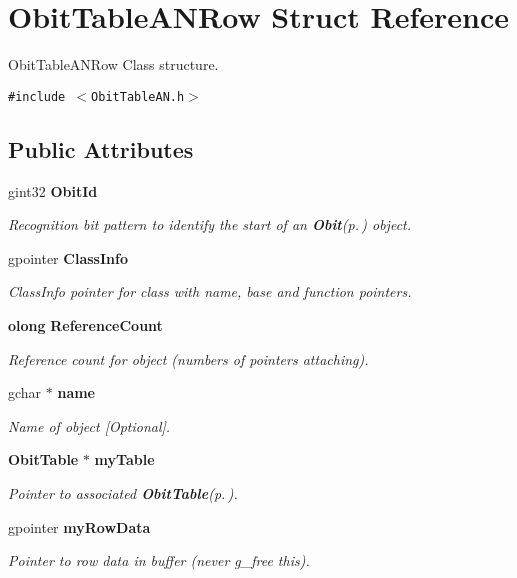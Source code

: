 \section{Obit\-Table\-ANRow Struct Reference}
\label{structObitTableANRow}
Obit\-Table\-ANRow Class structure.  


{\tt \#include $<$Obit\-Table\-AN.h$>$}

\subsection*{Public Attributes}
\begin{CompactItemize}
\item 
gint32 {\bf Obit\-Id}
\begin{CompactList}\small\item\em Recognition bit pattern to identify the start of an {\bf Obit}{\rm (p.\,\pageref{structObit})} object. \item\end{CompactList}\item 
gpointer {\bf Class\-Info}
\begin{CompactList}\small\item\em Class\-Info pointer for class with name, base and function pointers. \item\end{CompactList}\item 
{\bf olong} {\bf Reference\-Count}
\begin{CompactList}\small\item\em Reference count for object (numbers of pointers attaching). \item\end{CompactList}\item 
gchar $\ast$ {\bf name}
\begin{CompactList}\small\item\em Name of object [Optional]. \item\end{CompactList}\item 
{\bf Obit\-Table} $\ast$ {\bf my\-Table}
\begin{CompactList}\small\item\em Pointer to associated {\bf Obit\-Table}{\rm (p.\,\pageref{structObitTable})}. \item\end{CompactList}\item 
gpointer {\bf my\-Row\-Data}
\begin{CompactList}\small\item\em Pointer to row data in buffer (never g\_\-free this). \item\end{CompactList}\item 

\end{CompactItemize}
